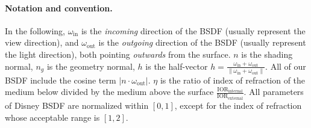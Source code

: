 \paragraph{Notation and convention.} In the following, $\omega_{\text{in}}$ is the \emph{incoming} direction of the BSDF (usually represent the view direction), and $\omega_{\text{out}}$ is the \emph{outgoing} direction of the BSDF (usually represent the light direction), both pointing \emph{outwards} from the surface. $n$ is the shading normal, $n_g$ is the geometry normal, $h$ is the half-vector $h = \frac{\omega_{\text{in}} + \omega_{\text{out}}}{\|\omega_{\text{in}} + \omega_{\text{out}}\|}$. All of our BSDF include the cosine term $|n \cdot \omega_{\text{out}}|$. $\eta$ is the ratio of index of refraction of the medium below divided by the medium above the surface $\frac{\text{IOR}_{\text{internal}}}{\text{IOR}_{\text{external}}}$. All parameters of Disney BSDF are normalized within $[0, 1]$, except for the index of refraction whose acceptable range is $[1, 2]$.

